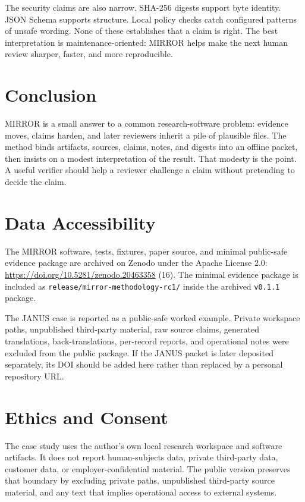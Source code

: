 \documentclass[10pt]{article}
\newcommand{\mirror}{MIRROR}
\begin{document}
The security claims are also narrow. SHA-256 digests support byte identity. JSON Schema supports structure. Local policy checks catch configured patterns of unsafe wording. None of these establishes that a claim is right. The best interpretation is maintenance-oriented: \mirror{} helps make the next human review sharper, faster, and more reproducible.

\section{Conclusion}

\mirror{} is a small answer to a common research-software problem: evidence moves, claims harden, and later reviewers inherit a pile of plausible files. The method binds artifacts, sources, claims, notes, and digests into an offline packet, then insists on a modest interpretation of the result. That modesty is the point. A useful verifier should help a reviewer challenge a claim without pretending to decide the claim.

\section*{Data Accessibility}

The MIRROR software, tests, fixtures, paper source, and minimal public-safe evidence package are archived on Zenodo under the Apache License 2.0: \url{https://doi.org/10.5281/zenodo.20463358} (16). The minimal evidence package is included as \texttt{release/mirror-methodology-rc1/} inside the archived \texttt{v0.1.1} package.

The JANUS case is reported as a public-safe worked example. Private workspace paths, unpublished third-party material, raw source claims, generated translations, back-translations, per-record reports, and operational notes were excluded from the public package. If the JANUS packet is later deposited separately, its DOI should be added here rather than replaced by a personal repository URL.

\section*{Ethics and Consent}

The case study uses the author's own local research workspace and software artifacts. It does not report human-subjects data, private third-party data, customer data, or employer-confidential material. The public version preserves that boundary by excluding private paths, unpublished third-party source material, and any text that implies operational access to external systems.
\end{document}
